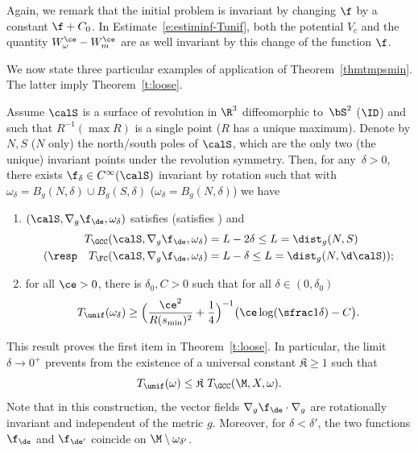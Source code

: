 Again, we remark that the initial problem is invariant by changing $\f$ by a constant $\f+C_0$. In Estimate~\eqref{e:estiminf-Tunif}, both the potential $V_{c}$ and the quantity $W_{\omega}^{\ce}-W_{m}^{\ce}$ are as well invariant by this change of the function $\f$.

We now state three particular examples of application of Theorem~\ref{thmtmpsmin}.
The latter imply Theorem~\ref{t:loose}.

\begin{corollary}
\label{c:sphere-disk}
Assume $\calS$ is a surface of revolution in $\R^3$ diffeomorphic to~$\bS^2$ (\resp $\ID$) and such that $R^{-1}(\max R)$ is a single point ($R$ has a unique maximum). Denote by $N,S$ (\resp $N$ only) the north/south poles of $\calS$, which are the only two (\resp the unique) invariant points under the revolution symmetry.
Then, for any~\hbox{$\delta>0$}, there exists $\f_\delta \in C^\infty(\calS)$ invariant by rotation such that
with $\omega_\delta = B_g(N, \delta) \cup B_g(S, \delta)$ (\resp $\omega_\delta = B_g(N, \delta)$) we have
\begin{enumerate}
\item $(\calS,\nabla_g\f_\de,\omega_\delta)$ satisfies \pGCC (\resp satisfies \pFC) and\vspace*{-3pt}
\begin{align*}
T_{\GCC}(\calS,\nabla_g\f_\de,\omega_\delta) &= L-2\delta \leq L= \dist_g(N,S)\\
(\resp \quad T_{\FC}(\calS,\nabla_g\f_\de,\omega_\delta) &= L-\delta \leq L= \dist_g(N,\d\calS));
\end{align*}
\item for all $\ce>0$, there is $\delta_0,C >0$ such that for all $\delta \in (0,\delta_0)$\vspace*{-3pt}
\[
T_{\unif}(\omega_\delta) \geq \Bigl( \frac{\ce^2}{R(s_{\min})^2} + \frac14 \Bigr)^{-1} \bigl( \ce \log(\sfrac1{\delta}) - C \bigr).
\]
\end{enumerate}
\end{corollary}
This result proves the first item in Theorem~\ref{t:loose}.
In particular, the limit \hbox{$\delta\to 0^+$} prevents from the existence of a universal constant $\mathfrak{K}\geq 1$ such that\vspace*{-3pt}
\[
T_{\unif}(\omega) \leq \mathfrak{K} \ T_{\GCC}(\M,X,\omega).
\]
Note that in this construction, the vector fields $\nabla_g\f_\de \cdot \nabla_g$ are rotationally invariant and independent of the metric $g$. Moreover, for $\delta < \delta'$, the two functions $\f_\de$ and $\f_{\de'}$ coincide on $\M\setminus \omega_{\delta'}$.

